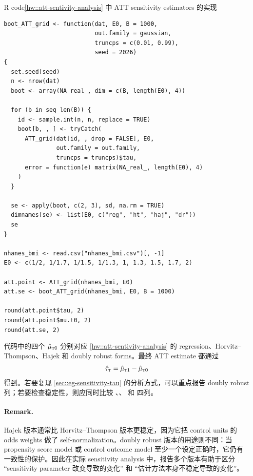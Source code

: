 \begin{exercisesolution}{R code}{\cref{hw::att-sentivity-analysis} 中 ATT sensitivity estimators 的实现}
\begin{lstlisting}
boot_ATT_grid <- function(dat, E0, B = 1000,
                          out.family = gaussian,
                          truncps = c(0.01, 0.99),
                          seed = 2026)
{
  set.seed(seed)
  n <- nrow(dat)
  boot <- array(NA_real_, dim = c(B, length(E0), 4))

  for (b in seq_len(B)) {
    id <- sample.int(n, n, replace = TRUE)
    boot[b, , ] <- tryCatch(
      ATT_grid(dat[id, , drop = FALSE], E0,
               out.family = out.family,
               truncps = truncps)$tau,
      error = function(e) matrix(NA_real_, length(E0), 4)
    )
  }

  se <- apply(boot, c(2, 3), sd, na.rm = TRUE)
  dimnames(se) <- list(E0, c("reg", "ht", "haj", "dr"))
  se
}

nhanes_bmi <- read.csv("nhanes_bmi.csv")[, -1]
E0 <- c(1/2, 1/1.7, 1/1.5, 1/1.3, 1, 1.3, 1.5, 1.7, 2)

att.point <- ATT_grid(nhanes_bmi, E0)
att.se <- boot_ATT_grid(nhanes_bmi, E0, B = 1000)

round(att.point$tau, 2)
round(att.point$mu.t0, 2)
round(att.se, 2)
\end{lstlisting}

代码中的四个 $\hat\mu_{\textsc{t}0}$ 分别对应 \cref{hw::att-sentivity-analysis} 的 regression、Horvitz--Thompson、Hajek 和 doubly robust forms。最终 ATT estimate 都通过
\[
\hat\tau_{\textsc{t}}=\hat\mu_{\textsc{t}1}-\hat\mu_{\textsc{t}0}
\]
得到。若要复现 \cref{sec::eg-sensitivity-tau} 的分析方式，可以重点报告 doubly robust 列；若要检查稳定性，则应同时比较 、、 和  四列。

\paragraph{Remark.}
Hajek 版本通常比 Horvitz--Thompson 版本更稳定，因为它把 control units 的 odds weights 做了 self-normalization。doubly robust 版本的用途则不同：当 propensity score model 或 control outcome model 至少一个设定正确时，它仍有一致性的保护。因此在实际 sensitivity analysis 中，报告多个版本有助于区分 ``sensitivity parameter 改变导致的变化'' 和 ``估计方法本身不稳定导致的变化''。
\end{exercisesolution}
